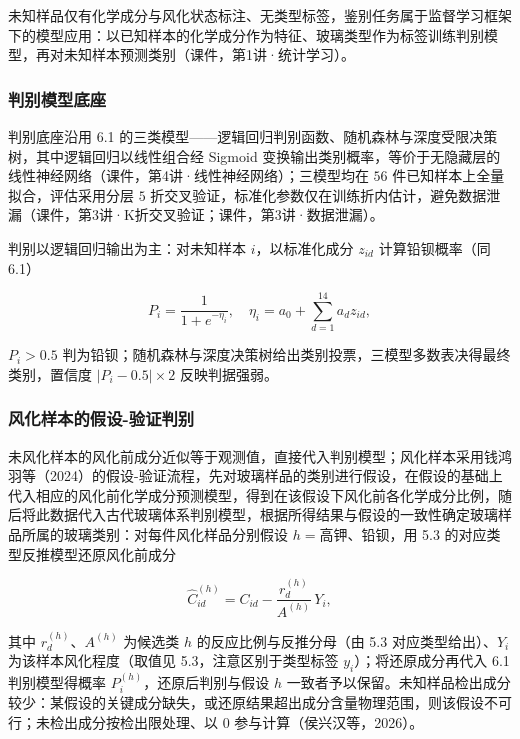 \documentclass{ctexart}
\begin{document}
未知样品仅有化学成分与风化状态标注、无类型标签，鉴别任务属于监督学习框架下的模型应用：以已知样本的化学成分作为特征、玻璃类型作为标签训练判别模型，再对未知样本预测类别（课件，第1讲·统计学习）。

\subsubsection{判别模型底座}

判别底座沿用 6.1 的三类模型——逻辑回归判别函数、随机森林与深度受限决策树，其中逻辑回归以线性组合经 Sigmoid 变换输出类别概率，等价于无隐藏层的线性神经网络（课件，第4讲·线性神经网络）；三模型均在 $56$ 件已知样本上全量拟合，评估采用分层 $5$ 折交叉验证，标准化参数仅在训练折内估计，避免数据泄漏（课件，第3讲·K折交叉验证；课件，第3讲·数据泄漏）。

判别以逻辑回归输出为主：对未知样本 $i$，以标准化成分 $z_{id}$ 计算铅钡概率（同 6.1）

\begin{equation*}
P_i=\frac{1}{1+e^{-\eta_i}},\quad \eta_{i}=a_{0}+\sum_{d=1}^{14}a_{d}z_{id},
\end{equation*}

$P_i>0.5$ 判为铅钡；随机森林与深度决策树给出类别投票，三模型多数表决得最终类别，置信度 $|P_i-0.5|\times2$ 反映判据强弱。


\subsubsection{风化样本的假设-验证判别}

未风化样本的风化前成分近似等于观测值，直接代入判别模型；风化样本采用钱鸿羽等（2024）的假设-验证流程，先对玻璃样品的类别进行假设，在假设的基础上代入相应的风化前化学成分预测模型，得到在该假设下风化前各化学成分比例，随后将此数据代入古代玻璃体系判别模型，根据所得结果与假设的一致性确定玻璃样品所属的玻璃类别：对每件风化样品分别假设 $h=$高钾、铅钡，用 5.3 的对应类型反推模型还原风化前成分

\begin{equation*}
\widehat{C}_{id}^{(h)}=C_{id}-\frac{r_{d}^{(h)}}{A^{(h)}}\,Y_{i},
\end{equation*}

其中 $r_{d}^{(h)}$、$A^{(h)}$ 为候选类 $h$ 的反应比例与反推分母（由 5.3 对应类型给出）、$Y_i$ 为该样本风化程度（取值见 5.3，注意区别于类型标签 $y_i$）；将还原成分再代入 6.1 判别模型得概率 $P_i^{(h)}$，还原后判别与假设 $h$ 一致者予以保留。未知样品检出成分较少：某假设的关键成分缺失，或还原结果超出成分含量物理范围，则该假设不可行；未检出成分按检出限处理、以 $0$ 参与计算（侯兴汉等，2026）。
\end{document}

